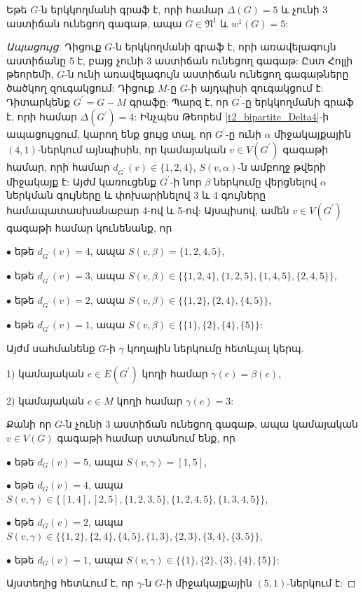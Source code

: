 \begin{theorem}
\label{t2_bipartite_Delta5_no3} Եթե $G$-ն երկկողմանի գրաֆ է, որի համար $\Delta(G)=5$ և չունի $3$ աստիճան ունեցող գագաթ, ապա $G\in \mathfrak{N}^{1}$ և
$w^{1}(G)=5$:
\end{theorem}
\begin{proof}[Ապացույց]
Դիցուք $G$-ն երկկողմանի գրաֆ է, որի առավելագույն աստիճանը $5$ է,
բայց չունի $3$ աստիճան ունեցող գագաթ: Ըստ Հոլլի թեորեմի, $G$-ն ունի առավելագույն աստիճան ունեցող գագաթները ծածկող զուգակցում: Դիցուք $M$-ը $G$-ի այդպիսի զուգակցում է: Դիտարկենք $G^{\prime}=G-M$ գրաֆը:
Պարզ է, որ $G^{\prime}$-ը երկկողմանի գրաֆ է, որի համար
$\Delta(G^{\prime})=4$: Ինչպես Թեորեմ \ref{t2_bipartite_Delta4}-ի ապացույցում, կարող ենք ցույց տալ, որ $G^{\prime}$-ը ունի $\alpha$ միջակայքային $(4,1)$-ներկում այնպիսին, որ կամայական $v\in
V(G^{\prime})$ գագաթի համար, որի համար $d_{G^{\prime}}(v)\in \{1,2,4\}$, $S(v,\alpha)$-ն ամբողջ թվերի միջակայք է: Այժմ կառուցենք $G^{\prime}$-ի նոր $\beta$ ներկումը վերցնելով $\alpha$ ներկման գույները և փոխարինելով 3 և 4 գույները համապատասխանաբար 4-ով և 5-ով: Այսպիսով, ամեն $v\in
V(G^{\prime})$ գագաթի համար կունենանք, որ

$\bullet$ եթե $d_{G^{\prime}}(v)=4$, ապա $S(v,\beta)=
\{1,2,4,5\}$,

$\bullet$ եթե $d_{G^{\prime}}(v)=3$, ապա
$S(v,\beta)\in \{\{1,2,4\},\{1,2,5\},\{1,4,5\},\{2,4,5\}\}$,

$\bullet$ եթե $d_{G^{\prime}}(v)=2$, ապա $S(v,\beta)\in
\{\{1,2\},\{2,4\},\{4,5\}\}$,

$\bullet$ եթե $d_{G^{\prime}}(v)=1$, ապա $S(v,\beta)\in
\{\{1\},\{2\},\{4\},\{5\}\}$:

Այժմ սահմանենք $G$-ի $\gamma$ կողային ներկումը հետևյալ կերպ.

1) կամայական $e\in E(G^{\prime})$ կողի համար $\gamma(e)=\beta(e)$,

2) կամայական $e\in M$ կողի համար $\gamma(e)=3$:

Քանի որ $G$-ն չունի $3$ աստիճան ունեցող գագաթ, ապա կամայական $v\in V(G)$ գագաթի համար ստանում ենք, որ

$\bullet$ եթե $d_{G}(v)=5$, ապա $S(v,\gamma)=[1,5]$,

$\bullet$ եթե $d_{G}(v)=4$, ապա $S(v,\gamma)\in
\{[1,4],[2,5],\{1,2,3,5\},\{1,2,4,5\},\{1,3,4,5\}\}$,

$\bullet$ եթե $d_{G}(v)=2$, ապա
$S(v,\gamma)\in
\{\{1,2\},\{2,4\},\{4,5\},\{1,3\},\{2,3\},\{3,4\},\{3,5\}\}$,

$\bullet$ եթե $d_{G}(v)=1$, ապա $S(v,\gamma)\in
\{\{1\},\{2\},\{3\},\{4\},\{5\}\}$:

Այստեղից հետևում է, որ $\gamma$-ն $G$-ի միջակայքային $(5,1)$-ներկում է:
\end{proof}

